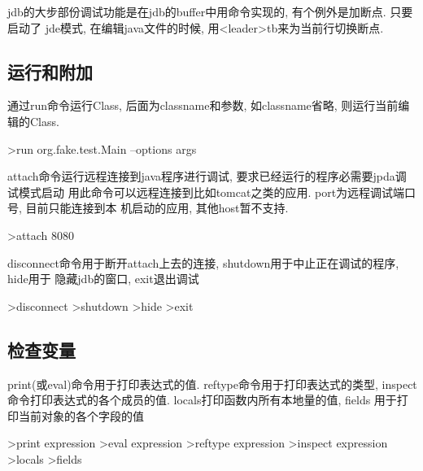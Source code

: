\documentclass[oneside,openany]{book}
\begin{document}
    jdb的大步部份调试功能是在jdb的buffer中用命令实现的, 有个例外是加断点. 只要启动了
    jde模式, 在编辑java文件的时候, 用<leader>tb来为当前行切换断点.

  \subsection{运行和附加}
    
    通过run命令运行Class, 后面为classname和参数, 如classname省略, 则运行当前编辑的Class.
    \begin{mdframed}[style=SmallFrame]
    \begin{flushleft}
    >run org.fake.test.Main --options args
    \end{flushleft}
    \end{mdframed}

    attach命令运行远程连接到java程序进行调试, 要求已经运行的程序必需要jpda调试模式启动
    用此命令可以远程连接到比如tomcat之类的应用. port为远程调试端口号, 目前只能连接到本
    机启动的应用, 其他host暂不支持.
    \begin{mdframed}[style=SmallFrame]
    \begin{flushleft}
    >attach 8080              
    \end{flushleft}
    \end{mdframed}

    disconnect命令用于断开attach上去的连接, shutdown用于中止正在调试的程序, hide用于
    隐藏jdb的窗口, exit退出调试 
    \begin{mdframed}[style=SmallFrame]
     \begin{flushleft}
    >disconnect\newline
    >shutdown\newline
    >hide\newline
    >exit                      
    \end{flushleft}
    \end{mdframed}

  \subsection{检查变量}
    print(或eval)命令用于打印表达式的值. reftype命令用于打印表达式的类型,
  inspect命令打印表达式的各个成员的值. locals打印函数内所有本地量的值, fields
  用于打印当前对象的各个字段的值
    \begin{mdframed}[style=SmallFrame]
      \begin{flushleft}
      >print expression\newline
      >eval expression\newline
      >reftype expression\newline                      
      >inspect expression\newline                      
      >locals\newline                      
      >fields
      \end{flushleft}
    \end{mdframed}
\end{document}
